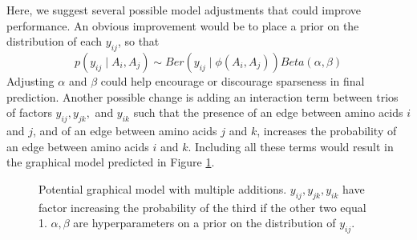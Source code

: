 \documentclass{article}
\begin{document}
Here, we suggest several possible model adjustments that could improve performance. An obvious improvement would be to place a prior on the distribution of each $y_{ij}$, so that
\[
p(y_{ij} \mid A_i, A_j) \sim Ber(y_{ij} \mid \phi(A_i, A_j))Beta(\alpha, \beta)
\]
Adjusting $\alpha$ and $\beta$ could help encourage or discourage sparseness in final prediction. Another possible change is adding an interaction term between trios of factors $y_{ij}, y_{jk},$ and $y_{ik}$ such that the presence of an edge between amino acids $i$ and $j$, and of an edge between amino acids $j$ and $k$, increases the probability of an edge between amino acids $i$ and $k$. Including all these terms would result in the graphical model predicted in Figure \ref{fig:model}.
\begin{figure}[H]
\centering
{}
\caption{Potential graphical model with multiple additions. $y_{ij}, y_{jk}, y_{ik}$ have factor increasing the probability of the third if the other two equal 1. $\alpha, \beta$ are hyperparameters on a prior on the distribution of $y_{ij}$.}
\label{fig:model}
\end{figure}
\end{document}
